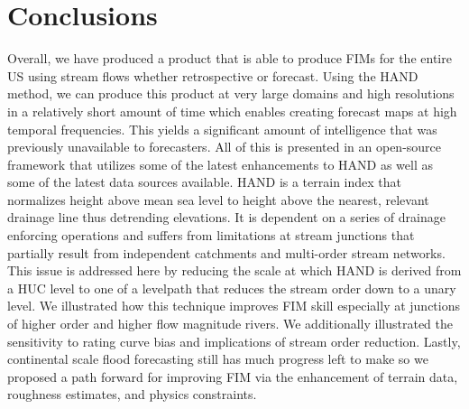 \section{Conclusions}
\label{sec:conclusions}
%
Overall, we have produced a product that is able to produce FIMs for the entire US using stream flows whether retrospective or forecast.
Using the HAND method, we can produce this product at very large domains and high resolutions in a relatively short amount of time which enables creating forecast maps at high temporal frequencies.
This yields a significant amount of intelligence that was previously unavailable to forecasters.
All of this is presented in an open-source framework that utilizes some of the latest enhancements to HAND as well as some of the latest data sources available. 
HAND is a terrain index that normalizes height above mean sea level to height above the nearest, relevant drainage line thus detrending elevations.
It is dependent on a series of drainage enforcing operations and suffers from limitations at stream junctions that partially result from independent catchments and multi-order stream networks.
This issue is addressed here by reducing the scale at which HAND is derived from a HUC level to one of a levelpath that reduces the stream order down to a unary level.
We illustrated how this technique improves FIM skill especially at junctions of higher order and higher flow magnitude rivers.
We additionally illustrated the sensitivity to rating curve bias and implications of stream order reduction.
Lastly, continental scale flood forecasting still has much progress left to make so we proposed a path forward for improving FIM via the enhancement of terrain data, roughness estimates, and physics constraints. 
%
